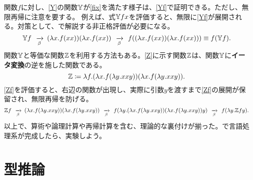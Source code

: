 \documentclass[10pt,a4paper]{book}
\DeclareMathOperator*{\app}{\enspace\xrightarrow[\beta]{}\enspace}
\begin{document}
%
関数$f$に対し、\eqref{Y}の関数$\mathbb{Y}$が\eqref{fix}を満たす様子は、\eqref{Yf}で証明できる。ただし、無限再帰に注意を要する。
例えば、式$\mathbb{Y}{}fx$を評価すると、無限に\eqref{Yf}が展開される。対策として、で解説する非正格評価が必要になる。
%
\begin{equation}
\label{eq:Yf}
\Yc{}f
\app (\lambda x.f(xx))(\lambda x.f(xx))
\app f((\lambda x.f(xx))(\lambda x.f(xx)))
\equiv f(\Yc{}f).
\end{equation}
%
関数$\mathbb{Y}$と等価な関数$\mathbb{Z}$を利用する方法もある。\eqref{Z}に示す関数$\mathbb{Z}{}$は、関数$\mathbb{Y}$に\textbf{イータ変換}の逆を施した関数である。
%
\begin{equation}
\label{eq:Z}
\mathbb{Z}{} \coloneqq \lambda f.(\lambda x.f(\lambda y.xxy))(\lambda x.f(\lambda y.xxy)).
\end{equation}
%
\eqref{Zf}を評価すると、右辺の関数が出現し、実際に引数$y$を渡すまで\eqref{Zf}の展開が保留され、無限再帰を防げる。
%
\begin{equation}
\label{eq:Zf}
\Zc{}f
\app (\lambda x.f(\lambda y.xxy))(\lambda x.f(\lambda y.xxy))
\app f(\lambda y.(\lambda x.f(\lambda y.xxy))(\lambda x.f(\lambda y.xxy))y)
\app f(\lambda y.\Zc{}fy).
\end{equation}
%
以上で、算術や論理計算や再帰計算を含む、理論的な裏付けが揃った。で言語処理系が完成したら、実験しよう。

\section{型推論}
\end{document}
